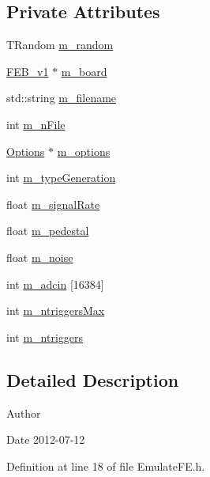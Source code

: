 \subsection*{Private Attributes}
\begin{DoxyCompactItemize}
\item 
T\+Random \hyperlink{classEmulateFE_a7f883bc6fb5bde2c98e464ef74e5c643}{m\+\_\+random}
\item 
\hyperlink{classFEB__v1}{F\+E\+B\+\_\+v1} $\ast$ \hyperlink{classEmulateFE_a6f3c6a104235b167e4465f4169cf8304}{m\+\_\+board}
\item 
std\+::string \hyperlink{classEmulateFE_a103fedea9eb5d3963573f9120cb81a68}{m\+\_\+filename}
\item 
int \hyperlink{classEmulateFE_a04ed956f5992c36590dd5a6abc19de2c}{m\+\_\+n\+File}
\item 
\hyperlink{classOptions}{Options} $\ast$ \hyperlink{classEmulateFE_a2f2da7d4b2164c47673a6ecc6dcef1ea}{m\+\_\+options}
\item 
int \hyperlink{classEmulateFE_aa8bd0aa42cc5f3d52930408807b3067c}{m\+\_\+type\+Generation}
\item 
float \hyperlink{classEmulateFE_a7aeff9e62f850ca6d7ee27dce02a060b}{m\+\_\+signal\+Rate}
\item 
float \hyperlink{classEmulateFE_a033996ce759c11305395ac865a6c074a}{m\+\_\+pedestal}
\item 
float \hyperlink{classEmulateFE_a74f8720a1da5806fad3811339ef9b98f}{m\+\_\+noise}
\item 
int \hyperlink{classEmulateFE_a647be38c790d5c0088e971aa28989589}{m\+\_\+adcin} \mbox{[}16384\mbox{]}
\item 
int \hyperlink{classEmulateFE_a2d473d12faf30f4870458874d70c7f55}{m\+\_\+ntriggers\+Max}
\item 
int \hyperlink{classEmulateFE_a8df57e3d66bde60e9a79cb2ae54a9f4a}{m\+\_\+ntriggers}
\end{DoxyCompactItemize}


\subsection{Detailed Description}
\begin{DoxyAuthor}{Author}

\end{DoxyAuthor}
\begin{DoxyDate}{Date}
2012-\/07-\/12 
\end{DoxyDate}


Definition at line 18 of file Emulate\+F\+E.\+h.



